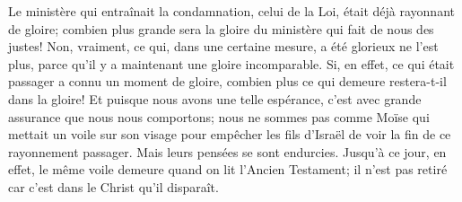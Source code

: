 Le ministère qui entraînait la condamnation, celui de la Loi,
	était déjà rayonnant de gloire;
	combien plus grande sera la gloire du ministère qui fait de nous des justes!
Non, vraiment, ce qui, dans une certaine mesure, a été glorieux
	ne l’est plus, parce qu’il y a maintenant une gloire incomparable.
Si, en effet, ce qui était passager a connu un moment de gloire,
	combien plus ce qui demeure restera-t-il dans la gloire!
Et puisque nous avons une telle espérance,
	c’est avec grande assurance que nous nous comportons;
	nous ne sommes pas comme Moïse qui mettait un voile sur son visage
	pour empêcher les fils d’Israël de voir la fin de ce rayonnement passager.
Mais leurs pensées se sont endurcies.
	Jusqu’à ce jour, en effet,
	le même voile demeure quand on lit l’Ancien Testament;
	il n’est pas retiré car c’est dans le Christ qu’il disparaît.

